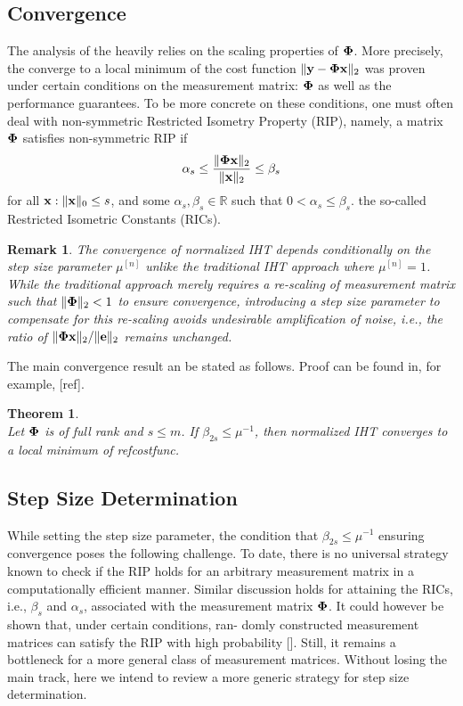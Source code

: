 \documentclass{article}
\newtheorem{theorem}{Theorem}
\newtheorem{remark}{Remark}
\begin{document}
\subsection{Convergence} 
The analysis of the heavily relies on the scaling properties of ${\bf \Phi}$. More precisely, the converge to a local minimum of the cost function $\|{\bf y}-{\bf \Phi x} \|_2$ was proven under certain conditions on the measurement matrix: ${\bf \Phi}$ as well as the performance guarantees. To be more concrete on these conditions, one must often deal with non-symmetric Restricted Isometry Property (RIP), namely, a matrix ${\bf \Phi}$ satisfies non-symmetric RIP if
\begin{equation}\label{rip}
\alpha_{s} \leq \frac{\|{\bf \Phi} {\bf x}\|_2}{\|{\bf x}\|_2} \leq \beta_{s}
\end{equation}
for all ${\bf x}: \|{\bf x}\|_0 \leq s$, and some $\alpha_s, \beta_s \in \mathbb{R}$ such that $0<\alpha_s\leq \beta_s$. the so-called Restricted Isometric Constants (RICs).
\begin{remark}
The convergence of normalized IHT depends conditionally on the step size parameter $\mu^{[n]}$ unlike the traditional IHT approach where $\mu^{[n]}=1$. While the traditional approach merely requires a re-scaling of measurement matrix such that $\|{\bf \Phi}\|_2 <1$ to ensure convergence, introducing a step size parameter to compensate for this re-scaling avoids undesirable amplification of noise, i.e., the ratio of $\|{\bf \Phi x}\|_2/\|{\bf e}\|_2$ remains unchanged. 
\end{remark}

The main convergence result an be stated as follows. Proof can be found in, for example, [ref].

\begin{theorem}
{\rm{\cite{niht}}}\\ 
Let ${\bf \Phi}$ is of full rank and $s\leq m$. If $\beta_{2s}\leq\mu^{-1}$, then normalized IHT converges to a local minimum of ref{costfunc}.
\end{theorem}

\subsection{Step Size Determination} 
While setting the step size parameter, the condition that $\beta_{2s}\leq\mu^{-1}$ ensuring convergence poses the following challenge. To date, there is no universal strategy known to check if the RIP holds for an arbitrary measurement matrix in a computationally efficient manner. Similar discussion holds for attaining the RICs, i.e., ${\beta_s}$ and $\alpha_s$, associated with the measurement matrix ${\bf \Phi}$. It could however be shown that, under certain conditions, ran-
domly constructed measurement matrices can satisfy
the RIP with high probability []. Still, it remains a bottleneck for a more general class of
measurement matrices. Without losing the main track, here we intend to review a more generic strategy for step size determination.
\end{document}
